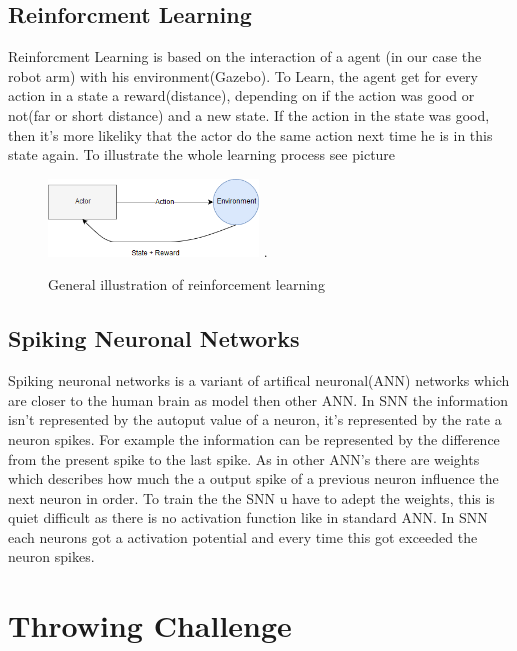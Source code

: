 \subsection{Reinforcment Learning}
Reinforcment Learning is based on the interaction of a agent (in our case the robot arm) with his environment(Gazebo). To Learn, the agent get for every action in a state a reward(distance), depending on if the action was good or not(far or short distance) and a new state. If the action in the state was good, then it's more likeliky that the actor do the same action next time he is in this state again. To illustrate the whole learning process see picture \label{re_base}
\begin{figure}[H]
	\centering
	\includegraphics[width=2.2in]{img/re_base.png}
	\DeclareGraphicsExtensions.
	\caption{General illustration of reinforcement learning}
	\label{r_base}
\end{figure}

\subsection{Spiking Neuronal Networks}
Spiking neuronal networks is a variant of artifical neuronal(ANN) networks which are closer to the human brain as model then other ANN. In SNN the information isn't represented by the autoput value of a neuron, it's represented by the rate a neuron spikes. For example the information can be represented by the difference from the present spike to the last spike. As in other ANN's there are weights which describes how much the a output spike of a previous neuron influence the next neuron in order. To train the the SNN u have to adept the weights, this is quiet difficult as there is no activation function like in standard ANN. In SNN each neurons got a activation potential and every time this got exceeded the neuron spikes.

\section{Throwing Challenge}
